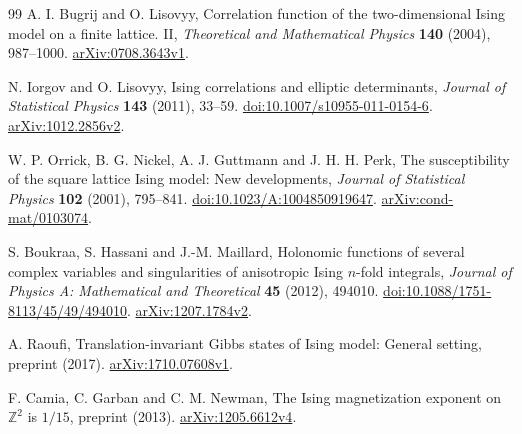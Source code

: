 \documentclass[11pt]{article}
\numberwithin{equation}{section}
\theoremstyle{definition}
\begin{document}
\begin{thebibliography}{99}
 A. I. Bugrij and O. Lisovyy,
Correlation function of the two-dimensional Ising model on a finite lattice. II,
\emph{Theoretical and Mathematical Physics} \textbf{140} (2004), 987--1000.
\href{https://arxiv.org/abs/0708.3643v1}{arXiv:0708.3643v1}.

 N. Iorgov and O. Lisovyy,
Ising correlations and elliptic determinants,
\emph{Journal of Statistical Physics} \textbf{143} (2011), 33--59.
\href{https://doi.org/10.1007/s10955-011-0154-6}{doi:10.1007/s10955-011-0154-6}.
\href{https://arxiv.org/abs/1012.2856v2}{arXiv:1012.2856v2}.

 W. P. Orrick, B. G. Nickel, A. J. Guttmann and J. H. H. Perk,
The susceptibility of the square lattice Ising model: New developments,
\emph{Journal of Statistical Physics} \textbf{102} (2001), 795--841.
\href{https://doi.org/10.1023/A:1004850919647}{doi:10.1023/A:1004850919647}.
\href{https://arxiv.org/abs/cond-mat/0103074}{arXiv:cond-mat/0103074}.

 S. Boukraa, S. Hassani and J.-M. Maillard,
Holonomic functions of several complex variables and singularities of
anisotropic Ising $n$-fold integrals,
\emph{Journal of Physics A: Mathematical and Theoretical}
\textbf{45} (2012), 494010.
\href{https://doi.org/10.1088/1751-8113/45/49/494010}{doi:10.1088/1751-8113/45/49/494010}.
\href{https://arxiv.org/abs/1207.1784v2}{arXiv:1207.1784v2}.

 A. Raoufi,
Translation-invariant Gibbs states of Ising model: General setting,
preprint (2017).
\href{https://arxiv.org/abs/1710.07608v1}{arXiv:1710.07608v1}.

 F. Camia, C. Garban and C. M. Newman,
The Ising magnetization exponent on $\mathbb Z^2$ is $1/15$,
preprint (2013).
\href{https://arxiv.org/abs/1205.6612v4}{arXiv:1205.6612v4}.

\end{thebibliography}
\end{document}
